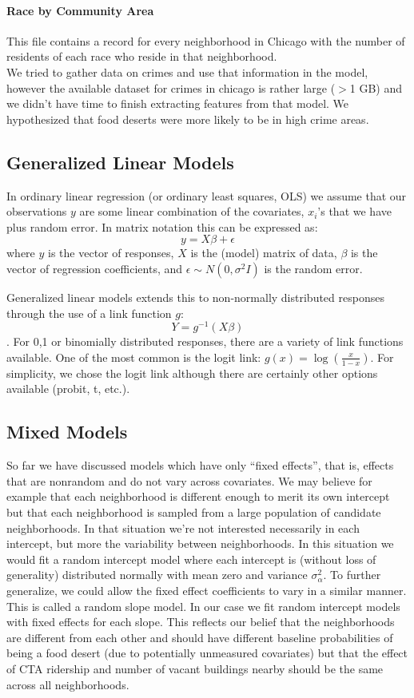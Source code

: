 \documentclass{report}
\begin{document}
\paragraph{ Race by Community Area }
This file contains a record for every neighborhood in Chicago with the number of residents of each race who reside in that neighborhood. \\

We tried to gather data on crimes and use that information in the model, however the available dataset for crimes in chicago is rather large ($>$1 GB) and we didn't have time to finish extracting features from that model. We hypothesized that food deserts were more likely to be in high crime areas. 

\subsection*{Generalized Linear Models}

In ordinary linear regression (or ordinary least squares, OLS) we assume that our observations $y$ are some linear combination of the covariates, $x_i$'s that we have plus random error. In matrix notation this can be expressed as: $$y = X\beta + \epsilon$$ where $y$ is the vector of responses, $X$ is the (model) matrix of data, $\beta$ is the vector of regression coefficients, and $\epsilon \sim N(0, \sigma^2 I)$ is the random error.

Generalized linear models extends this to non-normally distributed responses through the use of a link function $g$: $$Y = g^{-1}(X\beta)$$. For {0,1} or binomially distributed responses, there are a variety of link functions available. One of the most common is the logit link: $g(x) = \log(\frac{x}{1-x})$. For simplicity, we chose the logit link although there are certainly other options available (probit, t, etc.). 

\subsection*{Mixed Models}

So far we have discussed models which have only ``fixed effects'', that is, effects that are nonrandom and do not vary across covariates. We may believe for example that each neighborhood is different enough to merit its own intercept but that each neighborhood is sampled from a large population of candidate neighborhoods. In that situation we're not interested necessarily in each intercept, but more the variability between neighborhoods. In this situation we would fit a random intercept model where each intercept is (without loss of generality) distributed normally with mean zero and variance $\sigma^2_\alpha$.  To further generalize, we could allow the fixed effect coefficients to vary in a similar manner. This is called a random slope model. In our case we fit random intercept models with fixed effects for each slope. This reflects our belief that the neighborhoods are different from each other and should have different baseline probabilities of being a food desert (due to potentially unmeasured covariates) but that the effect of CTA ridership and number of vacant buildings nearby should be the same across all neighborhoods. 
\end{document}
